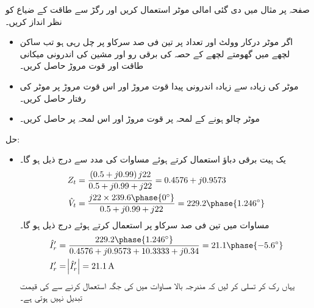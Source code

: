 صفحہ  پر مثال   میں دی گئی امالی موٹر استعمال کریں اور رگڑ سے طاقت کے ضیاع کو نظر انداز کریں۔
\begin{itemize}
\item
اگر موٹر درکار وولٹ اور تعداد  پر تین فی صد سرکاو پر چل رہی ہو تب  ساکن لچھے میں گھومتے لچھے کے حصہ کی  برقی رو  اور مشین کی اندرونی میکانی طاقت اور قوت مروڑ حاصل کریں۔
\item
موٹر کی زیادہ سے زیادہ اندرونی پیدا قوت مروڑ اور اس قوت مروڑ پر موٹر کی رفتار حاصل کریں۔
\item
موٹر چالو ہونے کے لمحہ پر قوت مروڑ اور اس لمحہ پر   حاصل کریں۔ 
\end{itemize}

حل:
\begin{itemize}
\item
 یک ہیت  برقی دباؤ   استعمال کرتے ہوئے مساوات   کی مدد سے درج ذیل ہو گا۔
\begin{align*}
Z_t&=\frac{\left(0.5+j 0.99 \right) j 22}{0.5+j 0.99+j 22}=0.4576+j 0.9573\\
\hat{V}_t&=\frac{j 22 \times 239.6 \phase{0^{\circ}}}{0.5+j 0.99+j 22}=229.2\phase{1.246^{\circ}}
\end{align*}
مساوات   میں  تین فی صد سرکاو پر   استعمال کرتے ہوئے درج ذیل ہو گا۔
\begin{align*}
\hat{I}_r'&=\frac{229.2 \phase{1.246^{\circ}}}{0.4576+j 0.9573+10.3333+j 0.34}=21.1\phase{-5.6^{\circ}}\\
I_r'&=\abs{\hat{I}_r'}=\SI{21.1}{\ampere}
\end{align*}
یہاں رک کر تسلی کر لیں کہ مندرجہ بالا مساوات میں  کی جگہ  استعمال کرنے سے  کی  قیمت تبدیل نہیں ہوتی ہے۔


\end{itemize}
